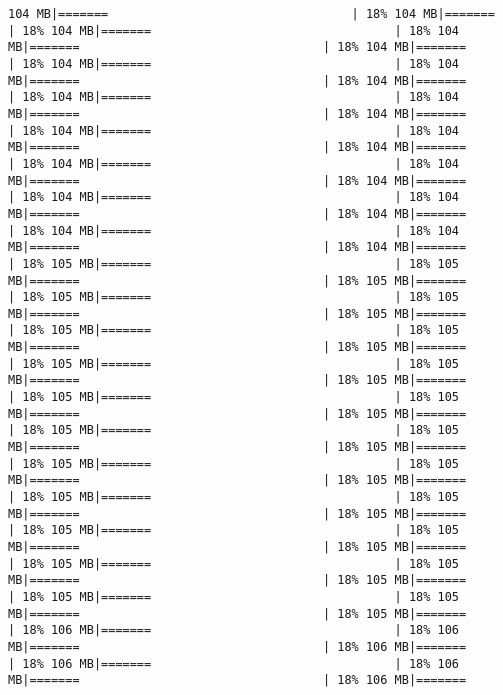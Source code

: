 \documentclass[
]{article}
\begin{document}
\begin{verbatim}
104 MB|=======                                  | 18% 104 MB|=======                                  | 18% 104 MB|=======                                  | 18% 104 MB|=======                                  | 18% 104 MB|=======                                  | 18% 104 MB|=======                                  | 18% 104 MB|=======                                  | 18% 104 MB|=======                                  | 18% 104 MB|=======                                  | 18% 104 MB|=======                                  | 18% 104 MB|=======                                  | 18% 104 MB|=======                                  | 18% 104 MB|=======                                  | 18% 104 MB|=======                                  | 18% 104 MB|=======                                  | 18% 104 MB|=======                                  | 18% 104 MB|=======                                  | 18% 104 MB|=======                                  | 18% 104 MB|=======                                  | 18% 104 MB|=======                                  | 18% 104 MB|=======                                  | 18% 104 MB|=======                                  | 18% 104 MB|=======                                  | 18% 105 MB|=======                                  | 18% 105 MB|=======                                  | 18% 105 MB|=======                                  | 18% 105 MB|=======                                  | 18% 105 MB|=======                                  | 18% 105 MB|=======                                  | 18% 105 MB|=======                                  | 18% 105 MB|=======                                  | 18% 105 MB|=======                                  | 18% 105 MB|=======                                  | 18% 105 MB|=======                                  | 18% 105 MB|=======                                  | 18% 105 MB|=======                                  | 18% 105 MB|=======                                  | 18% 105 MB|=======                                  | 18% 105 MB|=======                                  | 18% 105 MB|=======                                  | 18% 105 MB|=======                                  | 18% 105 MB|=======                                  | 18% 105 MB|=======                                  | 18% 105 MB|=======                                  | 18% 105 MB|=======                                  | 18% 105 MB|=======                                  | 18% 105 MB|=======                                  | 18% 105 MB|=======                                  | 18% 105 MB|=======                                  | 18% 105 MB|=======                                  | 18% 105 MB|=======                                  | 18% 105 MB|=======                                  | 18% 105 MB|=======                                  | 18% 105 MB|=======                                  | 18% 105 MB|=======                                  | 18% 105 MB|=======                                  | 18% 106 MB|=======                                  | 18% 106 MB|=======                                  | 18% 106 MB|=======                                  | 18% 106 MB|=======                                  | 18% 106 MB|=======                                  | 18% 106 MB|=======           
\end{verbatim}
\end{document}
